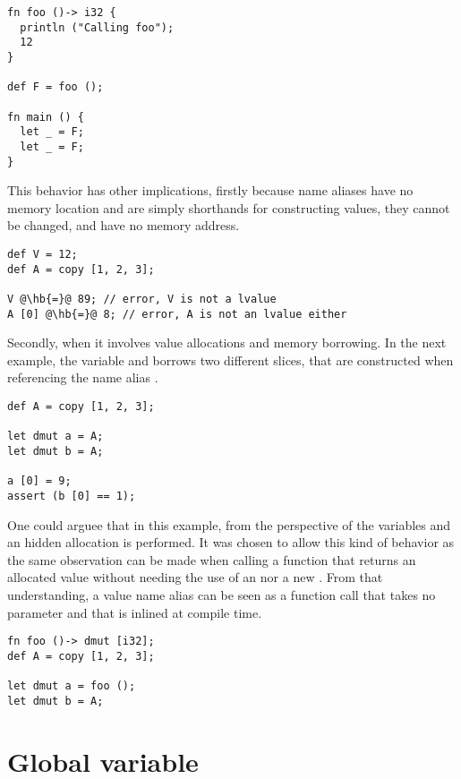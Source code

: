 \begin{lstlisting}[style=coloredverbatim]
fn foo ()-> i32 {
  println ("Calling foo");
  12
}

def F = foo ();

fn main () {
  let _ = F;
  let _ = F;
}
\end{lstlisting}


This behavior has other implications, firstly because name aliases have no
memory location and are simply shorthands for constructing values, they cannot
be changed, and have no memory address.

\begin{lstlisting}[style=coloredverbatim, escapechar=@]
def V = 12;
def A = copy [1, 2, 3];

V @\hb{=}@ 89; // error, V is not a lvalue
A [0] @\hb{=}@ 8; // error, A is not an lvalue either
\end{lstlisting}

Secondly, when it involves value allocations and memory borrowing. In the next
example, the variable  and  borrows two different slices, that
are constructed when referencing the name alias .

\begin{lstlisting}[style=coloredverbatim]
def A = copy [1, 2, 3];

let dmut a = A;
let dmut b = A;

a [0] = 9;
assert (b [0] == 1);
\end{lstlisting}

One could arguee that in this example, from the perspective of the variables
 and  an hidden allocation is performed. It was chosen to
allow this kind of behavior as the same observation can be made when calling a
function that returns an allocated value without needing the use of an
 nor a new . From that understanding, a value name
alias can be seen as a function call that takes no parameter and that is inlined
at compile time.

\begin{lstlisting}[style=coloredverbatim]
fn foo ()-> dmut [i32];
def A = copy [1, 2, 3];

let dmut a = foo ();
let dmut b = A;
\end{lstlisting}

\vfill%
\pagebreak

\section{Global variable}%
\label{sec:global_variables}

